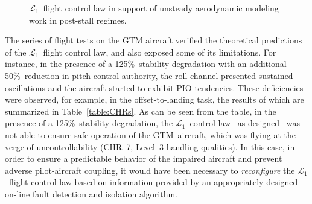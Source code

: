 \documentclass[letter,onecolumn,12pt]{aiaa-tc}
\newcommand{\Lone}{\mathcal{L}_1}
\begin{document}
\begin{figure}[ht]
\centering
    \hspace{5mm}
	\caption{\footnotesize $\Lone$~flight control law in support of unsteady aerodynamic modeling work in post-stall regimes.}
	\label{fig:GTM.modeling}
\end{figure}


The series of flight tests on the GTM aircraft verified the theoretical predictions of the $\Lone$~flight control law, and also exposed some of its limitations. For instance, in the presence of a 125\%~stability degradation with an additional 50\%~reduction in pitch-control authority, the roll channel presented sustained oscillations and the aircraft started to exhibit PIO tendencies. These deficiencies were observed, for example, in the offset-to-landing task, the results of which are summarized in Table~\ref{table:CHRs}. As can be seen from the table, in the presence of a 125\%~stability degradation, the $\Lone$~control law --as designed-- was not able to ensure safe operation of the GTM~aircraft, which was flying at the verge of uncontrollability (CHR~7, Level~3 handling qualities). In this case, in order to ensure a predictable behavior of the impaired aircraft and prevent adverse pilot-aircraft coupling, it would have been necessary to \emph{reconfigure} the $\Lone$~flight control law based on information provided by an appropriately designed on-line fault detection and isolation algorithm.
\end{document}
